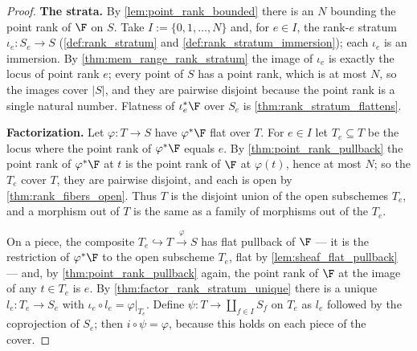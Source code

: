 \begin{proof}
  \leanok
  \textbf{The strata.}  By \cref{lem:point_rank_bounded} there is an \(N\)
  bounding the point rank of \(\F\) on \(S\).  Take
  \(I := \{0, 1, \dots, N\}\) and, for \(e \in I\), the rank-\(e\) stratum
  \(\iota_e : S_e \to S\)
  (\cref{def:rank_stratum} and \cref{def:rank_stratum_immersion}); each \(\iota_e\) is
  an immersion.  By \cref{thm:mem_range_rank_stratum} the image of
  \(\iota_e\) is exactly the locus of point rank \(e\); every point of
  \(S\) has a point rank, which is at most \(N\), so the images cover
  \(|S|\), and they are pairwise disjoint because the point rank is a
  single natural number.  Flatness of \(\iota_e^*\F\) over \(S_e\) is
  \cref{thm:rank_stratum_flattens}.

  \textbf{Factorization.}  Let \(\varphi : T \to S\) have \(\varphi^*\F\)
  flat over \(T\).  For \(e \in I\) let \(T_e \subseteq T\) be the locus
  where the point rank of \(\varphi^*\F\) equals \(e\).  By
  \cref{thm:point_rank_pullback} the point rank of \(\varphi^*\F\) at \(t\)
  is the point rank of \(\F\) at \(\varphi(t)\), hence at most \(N\); so
  the \(T_e\) cover \(T\), they are pairwise disjoint, and each is open by
  \cref{thm:rank_fibers_open}.  Thus \(T\) is the disjoint union of the
  open subschemes \(T_e\), and a morphism out of \(T\) is the same as a
  family of morphisms out of the \(T_e\).

  On a piece, the composite
  \(T_e \hookrightarrow T \xrightarrow{\varphi} S\) has flat pullback of
  \(\F\) --- it is the restriction of \(\varphi^*\F\) to the open subscheme
  \(T_e\), flat by \cref{lem:sheaf_flat_pullback} --- and, by
  \cref{thm:point_rank_pullback} again, the point rank of \(\F\) at the
  image of any \(t \in T_e\) is \(e\).  By
  \cref{thm:factor_rank_stratum_unique} there is a unique
  \(l_e : T_e \to S_e\) with \(\iota_e \circ l_e = \varphi|_{T_e}\).
  Define \(\psi : T \to \coprod_{f \in I} S_f\) on \(T_e\) as \(l_e\)
  followed by the coprojection of \(S_e\); then \(i \circ \psi = \varphi\),
  because this holds on each piece of the cover.


\end{proof}
